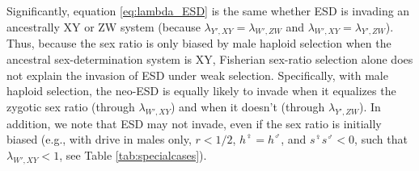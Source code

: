 \documentclass[12pt]{article}
\begin{document}

Significantly, equation \eqref{eq:lambda_ESD} is the same whether ESD is invading an ancestrally XY or ZW system (because $\lambda_{Y',XY} = \lambda_{W',ZW}$ and $\lambda_{W',XY} = \lambda_{Y',ZW}$).
Thus, because the sex ratio is only biased by male haploid selection when the ancestral sex-determination system is XY, Fisherian sex-ratio selection alone does not explain the invasion of ESD under weak selection. 
Specifically, with male haploid selection, the neo-ESD is equally likely to invade when it equalizes the zygotic sex ratio (through $\lambda_{W',XY}$) and when it doesn't (through $\lambda_{Y',ZW}$). 
In addition, we note that ESD may not invade, even if the sex ratio is initially biased (e.g., with drive in males only, $r<1/2$, $h^\female=h^\male$, and $s^\female s^\male<0$, such that $\lambda_{W',XY}<1$, see Table \ref{tab:specialcases}). 



\end{document}
